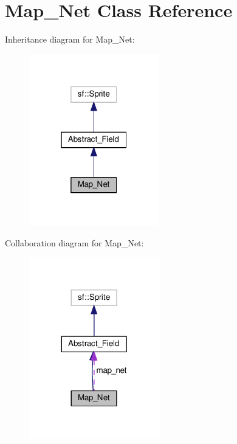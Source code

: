 \section{Map\+\_\+\+Net Class Reference}
\label{class_map___net}


Inheritance diagram for Map\+\_\+\+Net\+:
\nopagebreak
\begin{figure}[H]
\begin{center}
\leavevmode
\includegraphics[width=160pt]{class_map___net__inherit__graph}
\end{center}
\end{figure}


Collaboration diagram for Map\+\_\+\+Net\+:
\nopagebreak
\begin{figure}[H]
\begin{center}
\leavevmode
\includegraphics[width=161pt]{class_map___net__coll__graph}
\end{center}
\end{figure}
